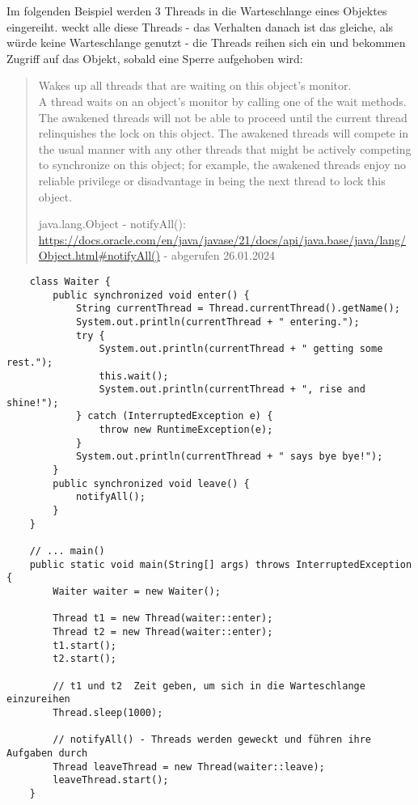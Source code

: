 \noindent
Im folgenden Beispiel werden 3 Threads in die Warteschlange eines Objektes eingereiht.  weckt alle diese Threads - das Verhalten danach ist das gleiche, als würde keine Warteschlange genutzt - die Threads reihen sich ein und bekommen Zugriff auf das Objekt, sobald eine Sperre aufgehoben wird:
\blockquote[{java.lang.Object - notifyAll(): \url{https://docs.oracle.com/en/java/javase/21/docs/api/java.base/java/lang/Object.html#notifyAll()} - abgerufen 26.01.2024}]{
    Wakes up all threads that are waiting on this object's monitor.\\ A thread waits on an object's monitor by calling one of the wait methods.
    The awakened threads will not be able to proceed until the current thread relinquishes the lock on this object. The awakened threads will compete in the usual manner with any other threads that might be actively competing to synchronize on this object; for example, the awakened threads enjoy no reliable privilege or disadvantage in being the next thread to lock this object.
}

\begin{verbatim}
    class Waiter {
        public synchronized void enter() {
            String currentThread = Thread.currentThread().getName();
            System.out.println(currentThread + " entering.");
            try {
                System.out.println(currentThread + " getting some rest.");
                this.wait();
                System.out.println(currentThread + ", rise and shine!");
            } catch (InterruptedException e) {
                throw new RuntimeException(e);
            }
            System.out.println(currentThread + " says bye bye!");
        }
        public synchronized void leave() {
            notifyAll();
        }
    }

    // ... main()
    public static void main(String[] args) throws InterruptedException {
        Waiter waiter = new Waiter();

        Thread t1 = new Thread(waiter::enter);
        Thread t2 = new Thread(waiter::enter);
        t1.start();
        t2.start();

        // t1 und t2  Zeit geben, um sich in die Warteschlange einzureihen
        Thread.sleep(1000);

        // notifyAll() - Threads werden geweckt und führen ihre Aufgaben durch
        Thread leaveThread = new Thread(waiter::leave);
        leaveThread.start();
    }
\end{verbatim}\\

